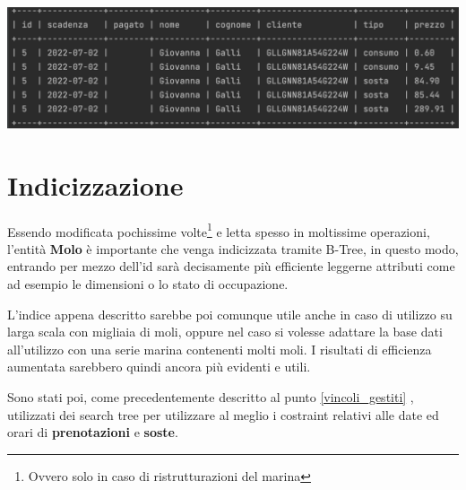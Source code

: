 \includegraphics[width = \linewidth]{img/result_fattura.png}

\section{Indicizzazione}

Essendo modificata pochissime volte\footnote{Ovvero solo in caso di ristrutturazioni del marina} e letta spesso in moltissime operazioni, l'entità \textbf{Molo} è importante che venga indicizzata tramite B-Tree, in questo modo, entrando per mezzo dell'id sarà decisamente più efficiente leggerne attributi come ad esempio le dimensioni o lo stato di occupazione.

L'indice appena descritto sarebbe poi comunque utile anche in caso di utilizzo su larga scala con migliaia di moli, oppure nel caso si volesse adattare la base dati all'utilizzo con una serie marina contenenti molti moli. I risultati di efficienza aumentata sarebbero quindi ancora più evidenti e utili.

Sono stati poi, come precedentemente descritto al punto \ref{vincoli_gestiti} , utilizzati dei search tree per utilizzare al meglio i costraint relativi alle date ed orari di \textbf{prenotazioni} e \textbf{soste}.
